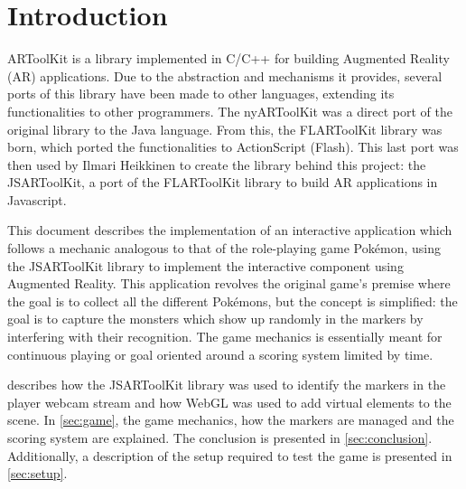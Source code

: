 \section{Introduction}
\label{sec:intro}

ARToolKit is a library implemented in C/C++ for building Augmented Reality (AR) applications. Due to the abstraction and mechanisms it provides, several ports of this library have been made to other languages, extending its functionalities to other programmers. The nyARToolKit was a direct port of the original library to the Java language. From this, the FLARToolKit library was born, which ported the functionalities to ActionScript (Flash). This last port was then used by Ilmari Heikkinen to create the library behind this project: the JSARToolKit, a port of the FLARToolKit library to build AR applications in Javascript.

This document describes the implementation of an interactive application which follows a mechanic analogous to that of the role-playing game Pokémon\textregistered, using the JSARToolKit library to implement the interactive component using Augmented Reality. This application revolves the original game's premise where the goal is to collect all the different Pokémons, but the concept is simplified: the goal is to capture the monsters which show up randomly in the markers by interfering with their recognition. The game mechanics is essentially meant for continuous playing or goal oriented around a scoring system limited by time.

 describes how the JSARToolKit library was used to identify the markers in the player webcam stream and how WebGL was used to add virtual elements to the scene. In \cref{sec:game}, the game mechanics, how the markers are managed and the scoring system are explained. The conclusion is presented in \cref{sec:conclusion}. Additionally, a description of the setup required to test the game is presented in \cref{sec:setup}.
